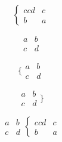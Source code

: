 \documentclass{article}
\def\mockarray{\begin{array}{cc} 
  a & b \\
  c & d \end{array}}
\def\mockcases{\begin{cases}{cc} 
  d & c \\
  b & a \end{cases}}
\begin{document}
\[\mockcases\]

\[\mockarray\]
  
\[\{ \mockarray\]
  
\[\mockarray \}\]

\[ \mockarray \mockcases \]
\end{document}
